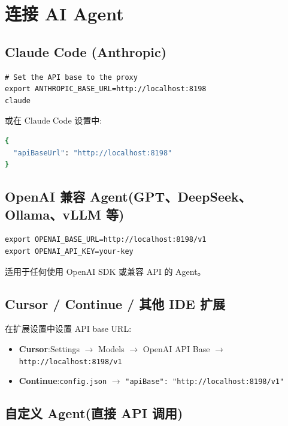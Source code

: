 \documentclass[11pt,a4paper]{article}
\begin{document}
\section{连接 AI Agent}

\subsection{Claude Code (Anthropic)}

\begin{lstlisting}
# Set the API base to the proxy
export ANTHROPIC_BASE_URL=http://localhost:8198
claude
\end{lstlisting}

或在 Claude Code 设置中:

\begin{lstlisting}[language=bash]
{
  "apiBaseUrl": "http://localhost:8198"
}
\end{lstlisting}

\subsection{OpenAI 兼容 Agent(GPT、DeepSeek、Ollama、vLLM 等)}

\begin{lstlisting}
export OPENAI_BASE_URL=http://localhost:8198/v1
export OPENAI_API_KEY=your-key
\end{lstlisting}

适用于任何使用 OpenAI SDK 或兼容 API 的 Agent。

\subsection{Cursor / Continue / 其他 IDE 扩展}

在扩展设置中设置 API base URL:
\begin{itemize}
  \item \textbf{Cursor}:Settings $\rightarrow$ Models $\rightarrow$ OpenAI API Base
        $\rightarrow$ \texttt{http://localhost:8198/v1}
  \item \textbf{Continue}:\texttt{config.json} $\rightarrow$
        \texttt{"apiBase": "http://localhost:8198/v1"}
\end{itemize}

\subsection{自定义 Agent(直接 API 调用)}
\end{document}
